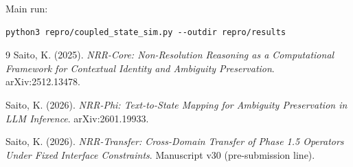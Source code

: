\documentclass[11pt,a4paper]{article}
\begin{document}
Main run:
\begin{lstlisting}
python3 repro/coupled_state_sim.py --outdir repro/results
\end{lstlisting}

\begin{thebibliography}{9}
Saito, K. (2025).
\textit{NRR-Core: Non-Resolution Reasoning as a Computational Framework for Contextual Identity and Ambiguity Preservation}.
arXiv:2512.13478.

Saito, K. (2026).
\textit{NRR-Phi: Text-to-State Mapping for Ambiguity Preservation in LLM Inference}.
arXiv:2601.19933.

Saito, K. (2026).
\textit{NRR-Transfer: Cross-Domain Transfer of Phase 1.5 Operators Under Fixed Interface Constraints}.
Manuscript v30 (pre-submission line).
\end{thebibliography}
\end{document}
